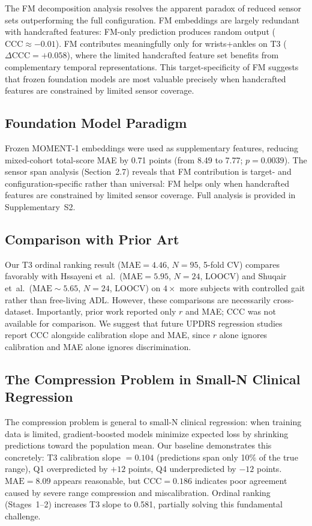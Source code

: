 \documentclass[11pt,a4paper]{article}
\begin{document}
The FM decomposition analysis resolves the apparent paradox of reduced sensor sets outperforming the full configuration. FM embeddings are largely redundant with handcrafted features: FM-only prediction produces random output ($\mathrm{CCC}\approx -0.01$). FM contributes meaningfully only for wrists+ankles on T3 ($\Delta\mathrm{CCC}=+0.058$), where the limited handcrafted feature set benefits from complementary temporal representations. This target-specificity of FM suggests that frozen foundation models are most valuable precisely when handcrafted features are constrained by limited sensor coverage.

\subsection{Foundation Model Paradigm}

Frozen MOMENT-1 embeddings were used as supplementary features, reducing mixed-cohort total-score MAE by 0.71 points (from 8.49 to 7.77; $p=0.0039$). The sensor span analysis (Section~2.7) reveals that FM contribution is target- and configuration-specific rather than universal: FM helps only when handcrafted features are constrained by limited sensor coverage. Full analysis is provided in Supplementary~S2.

\subsection{Comparison with Prior Art}

Our T3 ordinal ranking result ($\mathrm{MAE}=4.46$, $N=95$, 5-fold CV) compares favorably with Hssayeni et~al.\ ($\mathrm{MAE}=5.95$, $N=24$, LOOCV) and Shuqair et~al.\ ($\mathrm{MAE}\sim 5.65$, $N=24$, LOOCV) on $4\times$ more subjects with controlled gait rather than free-living ADL. However, these comparisons are necessarily cross-dataset. Importantly, prior work reported only $r$ and MAE; CCC was not available for comparison. We suggest that future UPDRS regression studies report CCC alongside calibration slope and MAE, since $r$ alone ignores calibration and MAE alone ignores discrimination.

\subsection{The Compression Problem in Small-N Clinical Regression}

The compression problem is general to small-N clinical regression: when training data is limited, gradient-boosted models minimize expected loss by shrinking predictions toward the population mean. Our baseline demonstrates this concretely: T3 calibration slope $=0.104$ (predictions span only 10\% of the true range), Q1 overpredicted by $+12$ points, Q4 underpredicted by $-12$ points. $\mathrm{MAE}=8.09$ appears reasonable, but $\mathrm{CCC}=0.186$ indicates poor agreement caused by severe range compression and miscalibration. Ordinal ranking (Stages~1--2) increases T3 slope to 0.581, partially solving this fundamental challenge.
\end{document}
